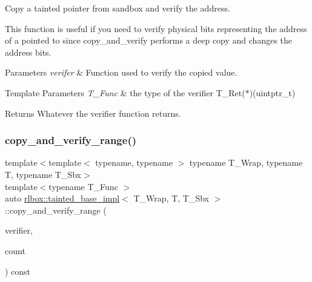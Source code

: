 Copy a tainted pointer from sandbox and verify the address. 

This function is useful if you need to verify physical bits representing the address of a pointed to since copy\+\_\+and\+\_\+verify performs a deep copy and changes the address bits.


\begin{DoxyParams}{Parameters}
{\em verifer} & Function used to verify the copied value. \\
\hline
\end{DoxyParams}

\begin{DoxyTemplParams}{Template Parameters}
{\em T\+\_\+\+Func} & the type of the verifier {\ttfamily T\+\_\+\+Ret($\ast$)(uintptr\+\_\+t)} \\
\hline
\end{DoxyTemplParams}
\begin{DoxyReturn}{Returns}
Whatever the verifier function returns. 
\end{DoxyReturn}
\mbox{\label{classrlbox_1_1tainted__base__impl_a76e49089d448ba0cfa7ef6d7c1e2d288}} 
\subsubsection{\texorpdfstring{copy\+\_\+and\+\_\+verify\+\_\+range()}{copy\_and\_verify\_range()}}
{\footnotesize\ttfamily template$<$template$<$ typename, typename $>$ typename T\+\_\+\+Wrap, typename T, typename T\+\_\+\+Sbx$>$ \\
template$<$typename T\+\_\+\+Func $>$ \\
auto \hyperlink{classrlbox_1_1tainted__base__impl}{rlbox\+::tainted\+\_\+base\+\_\+impl}$<$ T\+\_\+\+Wrap, T, T\+\_\+\+Sbx $>$\+::copy\+\_\+and\+\_\+verify\+\_\+range (\begin{DoxyParamCaption}\item[{T\+\_\+\+Func}]{verifier,  }\item[{std\+::size\+\_\+t}]{count }\end{DoxyParamCaption}) const\hspace{0.3cm}{\ttfamily [inline]}}



